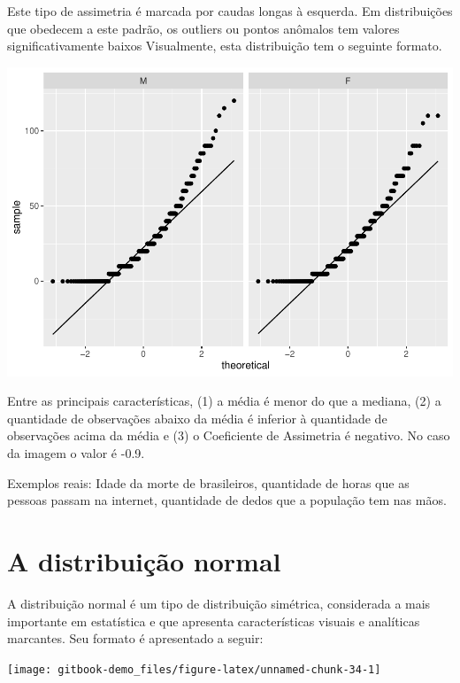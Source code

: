 \documentclass[
]{book}
\begin{document}
Este tipo de assimetria é marcada por caudas longas à esquerda. Em distribuições que obedecem a este padrão, os outliers ou pontos anômalos tem valores significativamente baixos Visualmente, esta distribuição tem o seguinte formato.

\begin{center}\includegraphics{gitbook-demo_files/figure-latex/unnamed-chunk-33-1} \end{center}

Entre as principais características, (1) a média é menor do que a mediana, (2) a quantidade de observações abaixo da média é inferior à quantidade de observações acima da média e (3) o Coeficiente de Assimetria é negativo. No caso da imagem o valor é -0.9.

Exemplos reais: Idade da morte de brasileiros, quantidade de horas que as pessoas passam na internet, quantidade de dedos que a população tem nas mãos.

\hypertarget{a-distribuiuxe7uxe3o-normal}{%
\section{A distribuição normal}\label{a-distribuiuxe7uxe3o-normal}}

A distribuição normal é um tipo de distribuição simétrica, considerada a mais importante em estatística e que apresenta características visuais e analíticas marcantes. Seu formato é apresentado a seguir:

\begin{center}\texttt{[image: gitbook-demo\_files/figure-latex/unnamed-chunk-34-1]} \end{center}
\end{document}
